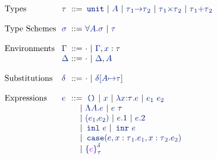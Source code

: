 \[\begin{array}{@{}l@{~~}l@{~}r@{}l@{}}
\mbox{Types} & \stau & \bnfdef & \stunit \bnfalt \svar{A}
      \bnfalt \sarrow{\stau_{\source{1}}}{\stau_{\source{2}}}
      \bnfalt \sprod{\stau_{\source{1}}}{\stau_{\source{2}}} \bnfalt \ssum{\stau_{\source{1}}}{\stau_{\source{2}}} \\
& & & \\

\mbox{Type Schemes} & \ssig & \bnfdef & \sall{\svar{A}}{\ssig} \bnfalt \stau \\
& & & \\


\mbox{Environments} & \senv & \bnfdef & \senvemp \bnfalt \senvext{\senv}{\svar{x}}{\stau} \\
& \stenv & \bnfdef & \senvemp \bnfalt \senvtext{\stenv}{\svar{A}} \\
& & & \\
\mbox{Substitutions} & \sesubst & \bnfdef & \sesubstemp \bnfalt \sesubstext{\sesubst}{\svar{A}}{\stau} \\
& & & \\
\mbox{Expressions} & \sexp & \bnfdef & \sunit \bnfalt \svar{x} \bnfalt \sabs{\svar{x}}{\stau}{\sexp} \bnfalt \sapp{\sexp_{\source{1}}}{\sexp_{\source{2}}} \\
& & \bnfalt & \stabs{A}{e} \bnfalt \stapp{\sexp}{\stau} \\
& & \bnfalt & \spair{\sexp_{\source{1}}}{\sexp_{\source{2}}} \bnfalt \sfst{\sexp} \bnfalt \ssnd{\sexp} \\
& & \bnfalt & \sinl{\sexp} \bnfalt \sinr{\sexp} \\
& & \bnfalt & \scasex{\sexp}{\stau_{\source{1}}}{\sexp_{\source{1}}}{\stau_{\source{2}}}{\sexp_{\source{2}}} \\
& & \bnfalt & \salien{\texp}{\stau}{\sdelta} \\
\end{array}\]
